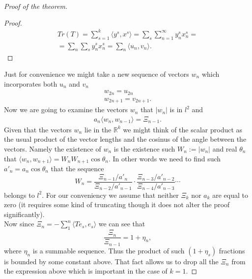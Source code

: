 \documentclass[12pt]{article}
\theoremstyle{definition}
\numberwithin{remark}{section}
\numberwithin{theorem}{section}
\numberwithin{prop}{section}
\numberwithin{equation}{section}
\numberwithin{lemma}{section}
\numberwithin{prop_under_lemma}{lemma}
\begin{document}
\begin{proof}[Proof of the theorem]
\begin{proof}
            \begin{multline*}
                Tr(T) = \sum_{s=1}^k \langle y^s, x^s \rangle = \sum_s \sum_{n=1}^\infty y^s_n x^s_n =\\
                      = \sum_n \sum_s y^s_n x^s_n = \sum_n \langle u_n, v_n \rangle.
            \end{multline*}
        \end{proof}
        Just for convenience we might take a new sequence of vectors $w_n$ which incorporates both $u_n$ and $v_n$
        \begin{align*}
            w_{2n} = u_{2n}\\
            w_{2n + 1} = v_{2n + 1}.
        \end{align*}
        Now we are going to examine the vectors $w_n$ that $|w_n|$ is in $l^2$ and
        \begin{align*}
            a_{n} \langle w_{n}, w_{n - 1}\rangle = \Xi_{n - 1}.
        \end{align*}
        Given that the vectors $w_n$ lie in the $\mathbb{R}^k$ we might think of the scalar product as
        the usual product of the vector lengths and the cosinus of the angle between the vectors.
        Namely the existence of $w_n$ is the existence such $W_n := |w_n|$ and real $\theta_n$ that
        $\langle w_{n}, w_{n+1}\rangle = W_n W_{n+1} \cos{\theta_n}.$
        In other words we need to find such $a'_n = a_n \cos{\theta_n}$ that
        the sequence
        $$
          W_n = \frac{\Xi_{n-1}/a'_n}{\Xi_{n-2}/a'_{n-1}} \cdot \frac{\Xi_{n-3}/a'_{n-2}}{\Xi_{n-4}/a'_{n-3}} \cdots
        $$
        belongs to $l^2$. For our conveniency we assume that neither $\Xi_k$ nor $a_k$ are equal to zero (it requires some kind of truncating though it does not alter the proof significantly).\\
        Now since $\Xi_n = -\sum_1^n \langle Te_s, e_s\rangle$ we can see that
        $$
            \frac{\Xi_n}{\Xi_{n-1}} = 1 + \eta_n,
        $$
        where $\eta_n$ is a summable sequence. Thus the product of such $(1 + \eta_s)$ fractions is bounded by 
        some constant above. That fact allows us to drop all the $\Xi_n$ from the expression above which is important in the
        case of $k = 1$.
        

\end{proof}
\end{document}
